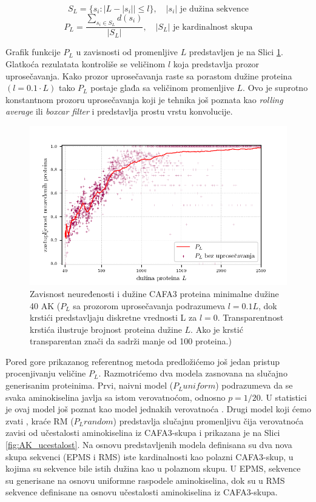 $$ S_L = \{s_i :  | L -  | s_i | | \le l  \}, \quad   |s_i| \text{ je dužina sekvence}  $$
$$ P_L = \dfrac{ \sum_{s_i \in S_L} d(s_i)} {| S_L |}, \quad   |S_L| \text{ je kardinalnost skupa}$$

Grafik funkcije $P_L$ u zavisnosti od promenljive $L$ predstavljen je na Slici
\ref{fig:PL1}.  Glatkoća rezulatata kontroliše se veličinom $l$ koja
predstavlja prozor uprosečavanja. Kako prozor uprosečavanja raste sa porastom
dužine proteina $(l = 0.1 \cdot L)$ tako $P_L$ postaje glađa sa veličinom
promenljive $L$. Ovo je suprotno konstantnom prozoru uprosečavanja  koji je
tehnika još poznata kao \textit{rolling average} ili \textit{boxcar filter} i
predstavlja prostu vrstu konvolucije. 


\begin{figure}[th]
\centering
\includegraphics[]{plots/PL_F}
\caption {
  Zavisnost neuređenosti i dužine CAFA3 proteina minimalne dužine 40 AK
  \footnotesize
  ($P_L$ sa prozorom uprosečavanja podrazumeva $l = 0.1L$, dok
  krstići predstavljaju diskretne vrednosti L za $l = 0$. Transparentnost krstića
  ilustruje brojnost proteina dužine $L$. Ako je krstić transparentan
  znači da sadrži manje od 100 proteina.)
}
\label{fig:PL1}
\end{figure}


Pored gore prikazanog referentnog metoda predložićemo još jedan pristup
procenjivanju veličine $P_L$.
Razmotrićemo dva modela zasnovana na slučajno generisanim proteinima. Prvi,
naivni model  ($P_L uniform$) podrazumeva da se svaka
aminokiselina javlja sa istom verovatnoćom, odnosno $p=1/20$. U statistici je ovaj
model još poznat kao model jednakih verovatnoća .
Drugi model koji ćemo zvati , kraće
RM ($P_L random$)  predstavlja slučajnu promenljivu čija verovatnoća zavisi od učestalosti
aminokiselina iz CAFA3-skupa i prikazana je na Slici \ref{fig:AK_ucestalost}.
Na osnovu predstavljenih modela definisana su dva nova skupa sekvenci (EPMS i
RMS) iste kardinalnosti kao polazni CAFA3-skup, u kojima su sekvence bile istih
dužina kao u polaznom skupu. U EPMS, sekvence su generisane na osnovu uniformne
raspodele aminokiselina, dok su u RMS sekvence definisane na osnovu učestalosti
aminokiselina iz CAFA3-skupa.


